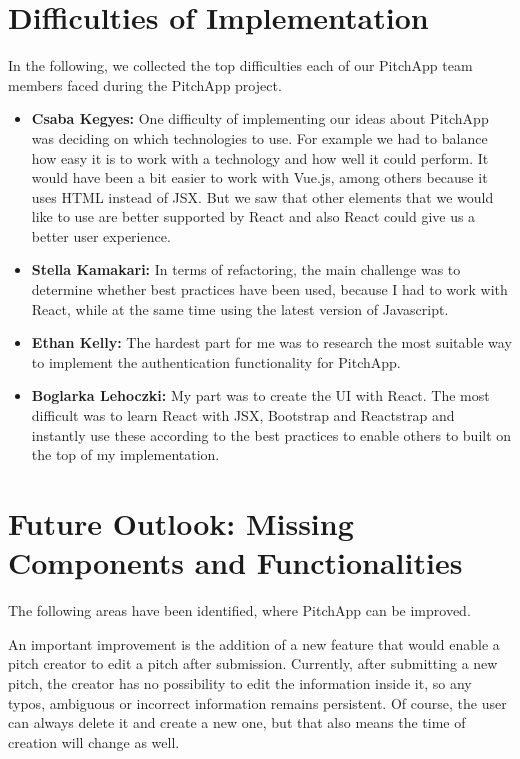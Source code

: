 \chapter{Difficulties of Implementation}
In the following, we collected the top difficulties each of our PitchApp team members faced during the PitchApp project.

\begin{itemize}
	\item \textbf{Csaba Kegyes:} One difficulty of implementing our ideas about PitchApp was deciding on which technologies to use. For example we had to balance how easy it is to work with a technology and how well it could perform. It would have been a bit easier to work with Vue.js, among others because it uses HTML instead of JSX. But we saw that other elements that we would like to use are better supported by React and also React could give us a better user experience.
    \item \textbf{Stella Kamakari:} In terms of refactoring, the main challenge was to determine whether best practices have been used, because I had to work with React, while at the same time using the latest version of Javascript.
	\item \textbf{Ethan Kelly:} The hardest part for me was to research the most suitable way to implement the authentication functionality for PitchApp.
	\item \textbf{Boglarka Lehoczki:} My part was to create the UI with React. The most difficult was to learn React with JSX, Bootstrap and Reactstrap and instantly use these according to the best practices to enable others to built on the top of my implementation.

\end{itemize}
\chapter{Future Outlook: Missing Components and Functionalities}


The following areas have been identified, where PitchApp can be improved.

An important improvement is the addition of a new feature that would enable a pitch creator to edit a pitch after submission. Currently, after submitting a new pitch, the creator has no possibility to edit the information inside it, so any typos, ambiguous or incorrect information remains persistent. Of course, the user can always delete it and create a new one, but that also means the time of creation will change as well.

